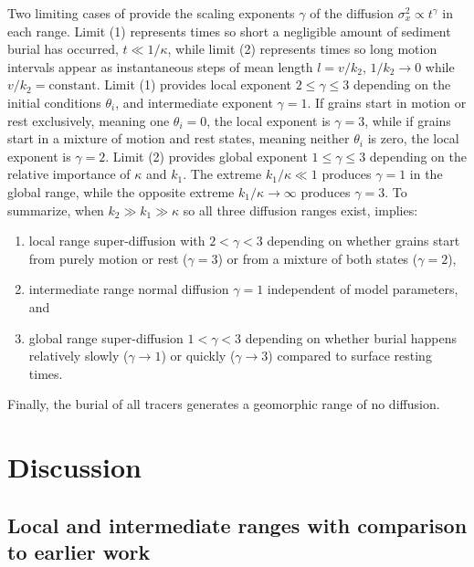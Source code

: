 Two limiting cases of \DIFdelbegin {}\DIFdelend \DIFaddbegin {}\DIFaddend provide the scaling exponents $\gamma$ of the diffusion $\sigma_x^2 \propto t^\gamma$ in each range. Limit (1) represents times so short \DIFaddbegin {}\DIFaddend a negligible amount of sediment burial has occurred, $t\ll 1/\kappa$, while limit (2) represents times so long motion intervals appear as instantaneous steps of mean length $l=v/k_2$, $1/k_2 \rightarrow 0$ while $v/k_2 = \text{constant}$.
Limit (1) provides local exponent $2 \leq \gamma \leq 3$ depending on the initial conditions $\theta_i$, and intermediate exponent $\gamma=1$.
If grains start in motion or rest exclusively, meaning one $\theta_i = 0$, the local exponent is $\gamma=3$, while if grains start in a mixture of motion and rest states, meaning neither $\theta_i$ is zero, the local exponent is $\gamma=2$.
Limit (2) provides global exponent $1 \leq \gamma \leq 3$ depending on the relative importance of $\kappa$ and $k_1$.
The extreme $k_1/\kappa \ll 1$ produces $\gamma=1$ in the global range, while the opposite extreme $k_1/\kappa \rightarrow \infty$ produces $\gamma=3$.
To summarize, when $k_2\gg k_1 \gg \kappa$ so all three diffusion ranges exist, \DIFdelbegin {}\DIFdelend \DIFaddbegin {}\DIFaddend implies:
\begin{enumerate}
	\item local range super-diffusion with $2<\gamma<3$ depending on whether grains start from purely motion or rest ($\gamma=3$) or from a mixture of both states ($\gamma=2$),
	\item intermediate range normal diffusion $\gamma=1$ independent of model parameters, and
	\item global range super-diffusion $1<\gamma<3$ depending on whether burial happens relatively slowly ($\gamma \rightarrow 1$) or quickly ($\gamma \rightarrow 3$) compared to surface resting times.
\end{enumerate}
Finally, the burial of all tracers generates a geomorphic range of no diffusion.

\section{Discussion}
\label{sec:discussion}

\subsection{Local and intermediate ranges with comparison to earlier work}

